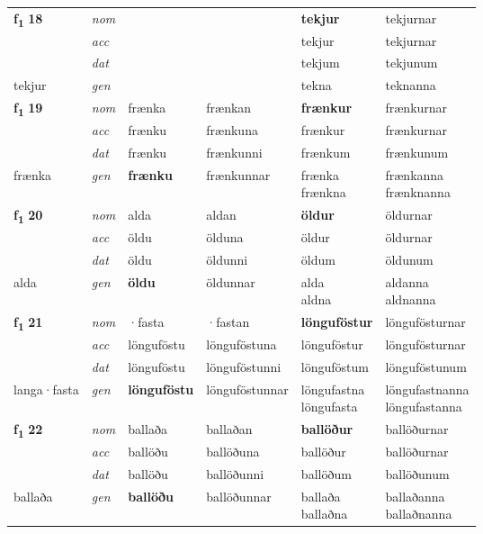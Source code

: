 \begin{longtable}[l]{X>{\footnotesize\itshape}XXXXX}
\multirow{3}{*}{{{\textbf{f{\textsubscript{1}}} \Large{\textbf{18}}}}} & nom &  &  & \textbf{tekjur} & tekjurnar \\*
 & acc &  &  & tekjur & tekjurnar \\*
 & dat &  &  & tekjum & tekjunum \\*
 {\footnotesize{tekjur}} & gen & \textbf{} &  & tekna & teknanna \\
\cmidrule{1-6}

\multirow{3}{*}{{{\textbf{f{\textsubscript{1}}} \Large{\textbf{19}}}}} & nom & frænka & frænkan & \textbf{frænkur} & frænkurnar \\*
 & acc & frænku & frænkuna & frænkur & frænkurnar \\*
 & dat & frænku & frænkunni & frænkum & frænkunum \\*
 {\footnotesize{frænka}} & gen & \textbf{frænku} & frænkunnar & \specialcell{frænka\\ frænkna} & \specialcell{frænkanna\\ frænknanna} \\
\cmidrule{1-6}

\multirow{3}{*}{{{\textbf{f{\textsubscript{1}}} \Large{\textbf{20}}}}} & nom & alda & aldan & \textbf{öldur} & öldurnar \\*
 & acc & öldu & ölduna & öldur & öldurnar \\*
 & dat & öldu & öldunni & öldum & öldunum \\*
 {\footnotesize{alda}} & gen & \textbf{öldu} & öldunnar & \specialcell{alda\\ aldna} & \specialcell{aldanna\\ aldnanna} \\
\cmidrule{1-6}

\multirow{3}{*}{{{\textbf{f{\textsubscript{1}}} \Large{\textbf{21}}}}} & nom & ·fasta & ·fastan & \textbf{lönguföstur} & löngufösturnar \\*
 & acc & lönguföstu & lönguföstuna & lönguföstur & löngufösturnar \\*
 & dat & lönguföstu & lönguföstunni & lönguföstum & lönguföstunum \\*
 {\footnotesize{langa\allowbreak ·fasta}} & gen & \textbf{lönguföstu} & lönguföstunnar & \specialcell{löngufastna\\  löngufasta} & \specialcell{löngufastnanna\\  löngufastanna} \\
\cmidrule{1-6}

\multirow{3}{*}{{{\textbf{f{\textsubscript{1}}} \Large{\textbf{22}}}}} & nom & ballaða & ballaðan & \textbf{ballöður} & ballöðurnar \\*
 & acc & ballöðu & ballöðuna & ballöður & ballöðurnar \\*
 & dat & ballöðu & ballöðunni & ballöðum & ballöðunum \\*
 {\footnotesize{ballaða}} & gen & \textbf{ballöðu} & ballöðunnar & \specialcell{ballaða\\ ballaðna} & \specialcell{ballaðanna\\ ballaðnanna} \\
\cmidrule{1-6}


\end{longtable}

